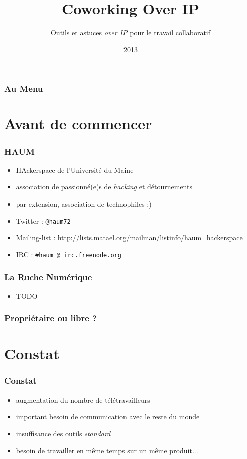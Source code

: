 \documentclass{beamer}
\title[Coworking-oIP]{Coworking Over IP}
\author{Outils et astuces \textit{over IP} pour le travail collaboratif}
\institute{Mathieu (matael) Gaborit | HAUM | Ruche Numérique}
\date{2013}
\begin{document}
\begin{frame}
\titlepage
\end{frame}

\begin{frame}
\frametitle{Au Menu}
\tableofcontents
\end{frame}

\section{Avant de commencer} %

\begin{frame}
    \frametitle{HAUM}

    \begin{itemize}
        \item HAckerspace de l'Université du Maine
        \item association de passionné(e)s de \textit{hacking} et détournements
        \item par extension, association de technophiles :)
        \item Twitter : \texttt{@haum72}
        \item Mailing-list : \url{http://lists.matael.org/mailman/listinfo/haum_hackerspace}
        \item IRC : \texttt{\#haum @ irc.freenode.org}
    \end{itemize}
\end{frame}

\begin{frame}
    \frametitle{La Ruche Numérique}

    \begin{itemize}
        \item TODO
    \end{itemize}
\end{frame}

\begin{frame}
    \frametitle{Propriétaire ou libre ?} 
\end{frame}

\section{Constat}

\begin{frame}
    \frametitle{Constat}

    \begin{itemize}[<+->]
        \item augmentation du nombre de télétravailleurs
        \item important besoin de communication avec le reste du monde
        \item insuffisance des outils \textit{standard}
        \item besoin de travailler en même temps sur un même produit...
    \end{itemize}
\end{frame}
\end{document}
